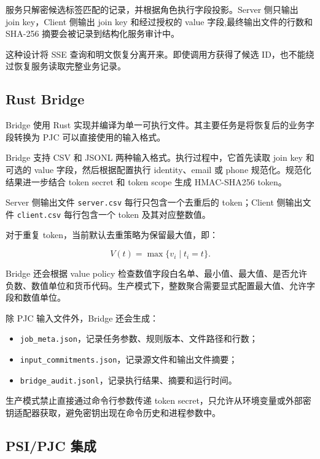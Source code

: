 \documentclass[UTF8,a4paper,12pt,oneside]{ctexrep}
\begin{document}
服务只解密候选标签匹配的记录，并根据角色执行字段投影。Server 侧只输出 join key，Client 侧输出 join key 和经过授权的 value 字段,最终输出文件的行数和 SHA-256 摘要会被记录到结构化服务审计中。

这种设计将 SSE 查询和明文恢复分离开来。即使调用方获得了候选 ID，也不能绕过恢复服务读取完整业务记录。

\subsection{Rust Bridge}

Bridge 使用 Rust 实现并编译为单一可执行文件。其主要任务是将恢复后的业务字段转换为 PJC 可以直接使用的输入格式。

Bridge 支持 CSV 和 JSONL 两种输入格式。执行过程中，它首先读取 join key 和可选的 value 字段，然后根据配置执行 identity、email 或 phone 规范化。规范化结果进一步结合 token secret 和 token scope 生成 HMAC-SHA256 token。

Server 侧输出文件 \texttt{server.csv} 每行只包含一个去重后的 token；Client 侧输出文件 \texttt{client.csv} 每行包含一个 token 及其对应整数值。

对于重复 token，当前默认去重策略为保留最大值，即：

\begin{equation}
V(t)=\max\{v_i\mid t_i=t\}.
\end{equation}

Bridge 还会根据 value policy 检查数值字段白名单、最小值、最大值、是否允许负数、数值单位和货币代码。生产模式下，整数聚合需要显式配置最大值、允许字段和数值单位。

除 PJC 输入文件外，Bridge 还会生成：

\begin{itemize}
  \item \texttt{job\_meta.json}，记录任务参数、规则版本、文件路径和行数；
  \item \texttt{input\_commitments.json}，记录源文件和输出文件摘要；
  \item \texttt{bridge\_audit.jsonl}，记录执行结果、摘要和运行时间。
\end{itemize}

生产模式禁止直接通过命令行参数传递 token secret，只允许从环境变量或外部密钥适配器获取，避免密钥出现在命令历史和进程参数中。

\subsection{PSI/PJC 集成}
\end{document}
